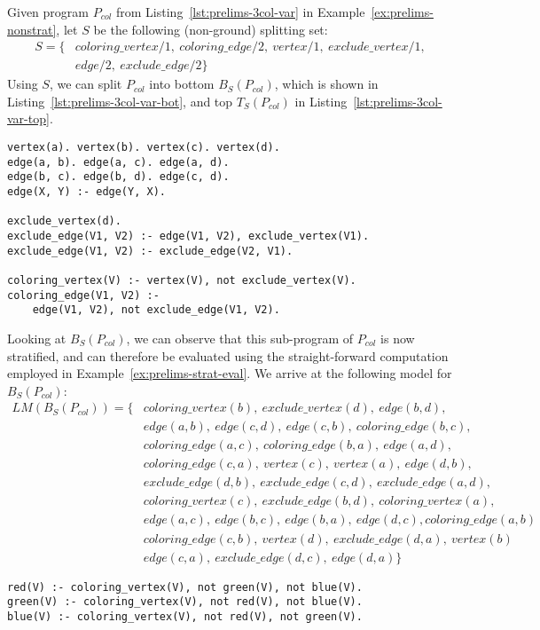 \begin{example}
\label{ex:prelims-nonstrat-splitting-sets}
Given program $P_{col}$ from Listing~\ref{lst:prelims-3col-var} in Example~\ref{ex:prelims-nonstrat}, let $S$ be the following (non-ground) splitting set:
\begin{align*}
	S = \{&coloring\_vertex/1,~coloring\_edge/2,~vertex/1,~exclude\_vertex/1, \\
		  &edge/2,~exclude\_edge/2\}
\end{align*}
Using $S$, we can split $P_{col}$ into bottom $B_S(P_{col})$, which is shown in Listing~\ref{lst:prelims-3col-var-bot}, and top $T_S(P_{col})$ in Listing~\ref{lst:prelims-3col-var-top}.
\begin{lstlisting}[style=asp-code, label={lst:prelims-3col-var-bot}, caption={The bottom part of $P_{col}$}]
vertex(a). vertex(b). vertex(c). vertex(d).
edge(a, b). edge(a, c). edge(a, d).
edge(b, c). edge(b, d). edge(c, d).
edge(X, Y) :- edge(Y, X).
	
exclude_vertex(d).
exclude_edge(V1, V2) :- edge(V1, V2), exclude_vertex(V1).
exclude_edge(V1, V2) :- exclude_edge(V2, V1).
	
coloring_vertex(V) :- vertex(V), not exclude_vertex(V).
coloring_edge(V1, V2) :- 
	edge(V1, V2), not exclude_edge(V1, V2).
\end{lstlisting}
Looking at $B_S(P_{col})$, we can observe that this sub-program of $P_{col}$ is now stratified, and can therefore be evaluated using the straight-forward computation employed in Example~\ref{ex:prelims-strat-eval}. We arrive at the following model for $B_S(P_{col})$:
\begin{align*}
	LM(B_S(P_{col})) = \{&coloring\_vertex(b),~exclude\_vertex(d),~edge(b, d), \\
						 &edge(a, b),~edge(c, d),~edge(c, b),~coloring\_edge(b, c),\\
						 &coloring\_edge(a, c),~coloring\_edge(b, a),~edge(a, d),\\
						 &coloring\_edge(c, a),~vertex(c),~	vertex(a),~edge(d, b), \\
						 &exclude\_edge(d, b),~exclude\_edge(c, d),~exclude\_edge(a, d),\\
						 &coloring\_vertex(c),~exclude\_edge(b, d),~coloring\_vertex(a),\\
						 &edge(a, c),~edge(b, c),~edge(b, a),~edge(d, c),coloring\_edge(a, b)\\
						 &coloring\_edge(c, b),~vertex(d),~exclude\_edge(d, a),~vertex(b)\\
						 &edge(c, a),~exclude\_edge(d, c),~edge(d, a)\}
\end{align*}		
\begin{lstlisting}[style=asp-code, label={lst:prelims-3col-var-top}, caption={The top part of $P_{col}$}]
% Guess colors
red(V) :- coloring_vertex(V), not green(V), not blue(V).
green(V) :- coloring_vertex(V), not red(V), not blue(V).
blue(V) :- coloring_vertex(V), not red(V), not green(V).
	

\end{lstlisting}
\end{example}
